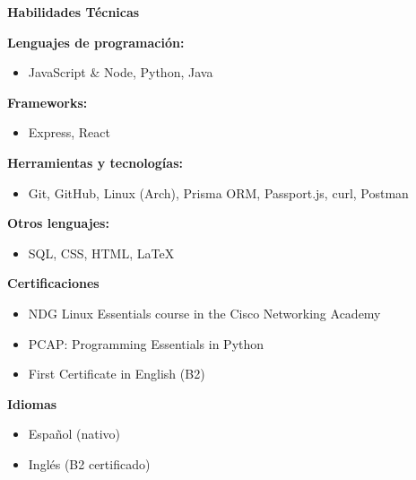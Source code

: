 \documentclass[a4paper,10pt]{article}
\newcommand{\cvsection}[1]{%
  \vspace{0.7em}
  \noindent\colorbox{modernblue!10}{\parbox{\dimexpr\linewidth-2\fboxsep}{\textbf{\large\color{modernblue} #1}}}
  \vspace{0.2em}
}
\begin{document}
\cvsection{Habilidades Técnicas}
\begin{tcolorbox}[colback=gray!5!white, colframe=gray!50!black, boxrule=0.2mm, arc=1mm, left=1mm, right=1mm, top=1mm, bottom=1mm, width=\textwidth]
\textbf{Lenguajes de programación:}
\begin{itemize}[leftmargin=0.7cm, label=]
    \item JavaScript \& Node, Python, Java
\end{itemize}
\textbf{Frameworks:}
\begin{itemize}[leftmargin=0.7cm, label=]
    \item Express, React
\end{itemize}
\textbf{Herramientas y tecnologías:}
\begin{itemize}[leftmargin=0.7cm, label=]
    \item Git, GitHub, Linux (Arch), Prisma ORM, Passport.js, curl, Postman
\end{itemize}
\textbf{Otros lenguajes:}
\begin{itemize}[leftmargin=0.7cm, label=]
    \item SQL, CSS, HTML, LaTeX
\end{itemize}
\end{tcolorbox}

\cvsection{Certificaciones}
\begin{itemize}[leftmargin=0.7cm, label=]
    \item NDG Linux Essentials course in the Cisco Networking Academy
    \item PCAP: Programming Essentials in Python
    \item First Certificate in English (B2)
\end{itemize}

\cvsection{Idiomas}
\begin{itemize}[leftmargin=0.7cm, label=]
    \item Español (nativo)
    \item Inglés (B2 certificado)
\end{itemize}





\end{document}
